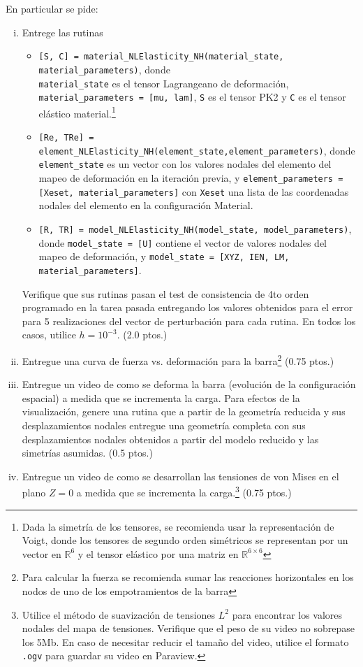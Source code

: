 \documentclass[11pt,letterpaper]{article}
\def\R{\mbox{\(\mathbb{R}\)}}
\begin{document}
En particular se pide:
\begin{enumerate}[i)]
	\item Entrege las rutinas 
	\begin{itemize}
		\item \texttt{[S, C] = material\_NLElasticity\_NH(material\_state, material\_parameters)}, donde \\\texttt{material\_state} es el tensor Lagrangeano de deformaci\'on, {\tt material\_parameters = [mu, lam]}, {\tt S} es el tensor PK2 y {\tt C} es el tensor el\'astico material.\footnote{Dada la simetr\'ia de los tensores, se recomienda usar la representaci\'on de Voigt, donde los tensores de segundo orden sim\'etricos se representan por un vector en $\R^6$ y el tensor el\'astico por una matriz en $\R^{6 \times 6}$}
		\item {\tt [Re, TRe] = element\_NLElasticity\_NH(element\_state,element\_parameters)}, donde\\ {\tt element\_state} es un vector con los valores nodales del elemento del mapeo de deformaci\'on en la iteraci\'on previa, y  {\tt element\_parameters = [Xeset, material\_parameters]} con {\tt Xeset} una lista de las coordenadas nodales del elemento en la configuraci\'on Material.
		\item {\tt [R, TR] = model\_NLElasticity\_NH(model\_state, model\_parameters)}, donde {\tt model\_state = [U]} contiene el vector de valores nodales del mapeo de deformaci\'on, y {\tt model\_state = [XYZ, IEN, LM, material\_parameters]}.  
	\end{itemize}
	
	Verifique que sus rutinas pasan el test de consistencia de 4to orden programado en la tarea pasada entregando los valores obtenidos para el error para 5 realizaciones del vector de perturbaci\'on para cada rutina. En todos los casos, utilice $h=10^{-3}$. (2.0 ptos.)
	\item Entregue una curva de fuerza vs. deformaci\'on para la barra\footnote{Para calcular la fuerza se recomienda sumar las reacciones horizontales en los nodos de uno de los empotramientos de la barra} (0.75 ptos.)
	\item Entregue un video de como se deforma la barra (evoluci\'on de la configuraci\'on espacial) a medida que se incrementa la carga. Para efectos de la visualizaci\'on, genere una rutina que a partir de la geometr\'ia reducida y sus desplazamientos nodales entregue una geometr\'ia completa con sus desplazamientos nodales obtenidos a partir del modelo reducido y las simetr\'ias asumidas. (0.5 ptos.)
	\item Entregue un video de como se desarrollan las tensiones de von Mises en el plano $Z=0$ a medida que se incrementa la carga.\footnote{Utilice el m\'etodo de suavizaci\'on de tensiones $L^2$ para encontrar los valores nodales del mapa de tensiones. Verifique que el peso de su video no sobrepase los 5Mb. En caso de necesitar reducir el tama\~no del video, utilice el formato {\tt .ogv} para guardar su video en Paraview.} (0.75 ptos.)
\end{enumerate}
\end{document}
